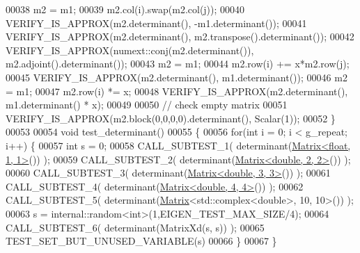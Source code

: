 \begin{DoxyCode}
00038   m2 = m1;
00039   m2.col(i).swap(m2.col(j));
00040   VERIFY\_IS\_APPROX(m2.determinant(), -m1.determinant());
00041   VERIFY\_IS\_APPROX(m2.determinant(), m2.transpose().determinant());
00042   VERIFY\_IS\_APPROX(numext::conj(m2.determinant()), m2.adjoint().determinant());
00043   m2 = m1;
00044   m2.row(i) += x*m2.row(j);
00045   VERIFY\_IS\_APPROX(m2.determinant(), m1.determinant());
00046   m2 = m1;
00047   m2.row(i) *= x;
00048   VERIFY\_IS\_APPROX(m2.determinant(), m1.determinant() * x);
00049   
00050   \textcolor{comment}{// check empty matrix}
00051   VERIFY\_IS\_APPROX(m2.block(0,0,0,0).determinant(), Scalar(1));
00052 \}
00053 
00054 \textcolor{keywordtype}{void} test\_determinant()
00055 \{
00056   \textcolor{keywordflow}{for}(\textcolor{keywordtype}{int} i = 0; i < g\_repeat; i++) \{
00057     \textcolor{keywordtype}{int} s = 0;
00058     CALL\_SUBTEST\_1( determinant(\hyperlink{group___core___module_class_eigen_1_1_matrix}{Matrix<float, 1, 1>}()) );
00059     CALL\_SUBTEST\_2( determinant(\hyperlink{group___core___module_class_eigen_1_1_matrix}{Matrix<double, 2, 2>}()) );
00060     CALL\_SUBTEST\_3( determinant(\hyperlink{group___core___module_class_eigen_1_1_matrix}{Matrix<double, 3, 3>}()) );
00061     CALL\_SUBTEST\_4( determinant(\hyperlink{group___core___module_class_eigen_1_1_matrix}{Matrix<double, 4, 4>}()) );
00062     CALL\_SUBTEST\_5( determinant(\hyperlink{group___core___module_class_eigen_1_1_matrix}{Matrix}<std::complex<double>, 10, 10>()) );
00063     s = internal::random<int>(1,EIGEN\_TEST\_MAX\_SIZE/4);
00064     CALL\_SUBTEST\_6( determinant(MatrixXd(s, s)) );
00065     TEST\_SET\_BUT\_UNUSED\_VARIABLE(s)
00066   \}
00067 \}
\end{DoxyCode}
